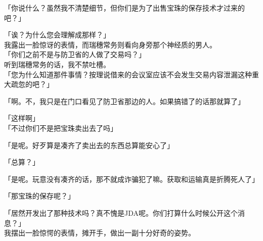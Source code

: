 「你说什么？虽然我不清楚细节，但你们是为了出售宝珠的保存技术才过来的吧？」

「诶？为什么您会理解成那样？」\\

我露出一脸惊讶的表情，而瑞穗常务则看向身旁那个神经质的男人。\\

「你们之前不是与防卫省的人做了交易吗？」\\

听到瑞穗常务的话，我不禁吐槽。\\

「您为什么知道那件事情？按理说借来的会议室应该不会发生交易内容泄漏这种重大疏忽的吧？」

「啊。不，我只是在门口看见了防卫省那边的人。如果搞错了的话那就算了」

「这样啊」\\

「不过你们不是把宝珠卖出去了吗」

「是呢。好歹算是凑齐了卖出去的东西总算能安心了」

「总算？」

「是呢。玩意没有凑齐的话，那不就成诈骗犯了嘛。获取和运输真是折腾死人了」

「那宝珠的保存呢？」

「居然开发出了那种技术吗？真不愧是JDA呢。你们打算什么时候公开这个消息？」\\

我摆出一脸惊愕的表情，摊开手，做出一副十分好奇的姿势。\\

